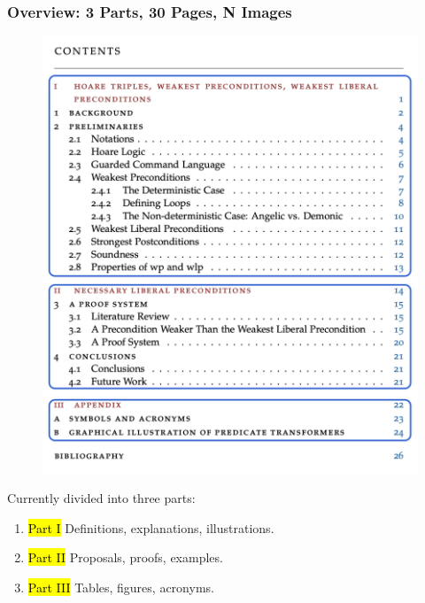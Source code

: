 \documentclass[aspectratio=169]{beamer}
\begin{document}
\begin{frame}[fragile]
	\frametitle{Overview: 3 Parts, 30 Pages, N Images}
	\begin{minipage}{0.42\linewidth}	
		\begin{figure}
	    \centering\includegraphics[width=\textwidth]{images/toc-split.png} 
	  \end{figure}
	\end{minipage}
\begin{minipage}{0.57\linewidth}
	Currently divided into three parts: 
		\begin{enumerate}
		    \item[] \hl{Part I} Definitions, explanations, illustrations. 
		    \item[] \hl{Part II} Proposals, proofs, examples. 
		    \item[] \hl{Part III} Tables, figures, acronyms. 
		\end{enumerate}
	\end{minipage}
\end{frame}
\end{document}
